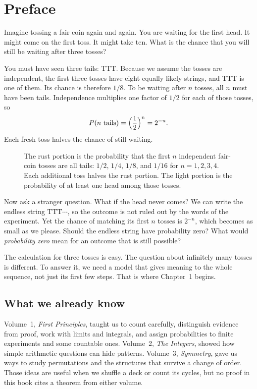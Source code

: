 \chapter*{Preface}

Imagine tossing a fair coin again and again. You are waiting for the first head. It might come on the first toss. It might take ten. What is the chance that you will still be waiting after three tosses?

You must have seen three tails: TTT. Because we assume the tosses are independent, the first three tosses have eight equally likely strings, and TTT is one of them. Its chance is therefore $1/8$. To be waiting after $n$ tosses, all $n$ must have been tails. Independence multiplies one factor of $1/2$ for each of those tosses, so
\[
  P(\text{$n$ tails})=\Bigl(\frac12\Bigr)^n=2^{-n}.
\]
Each fresh toss halves the chance of still waiting.

\begin{figure}[ht]
\centering
{}
\caption{The rust portion is the probability that the first $n$ independent fair-coin tosses are all tails: $1/2$, $1/4$, $1/8$, and $1/16$ for $n=1,2,3,4$. Each additional toss halves the rust portion. The light portion is the probability of at least one head among those tosses.}
\label{fig:prefacetails}
\end{figure}

Now ask a stranger question. What if the head never comes? We can write the endless string TTT$\cdots$, so the outcome is not ruled out by the words of the experiment. Yet the chance of matching its first $n$ tosses is $2^{-n}$, which becomes as small as we please. Should the endless string have probability zero? What would \emph{probability zero} mean for an outcome that is still possible?

The calculation for three tosses is easy. The question about infinitely many tosses is different. To answer it, we need a model that gives meaning to the whole sequence, not just its first few steps. That is where Chapter~1 begins.

\section*{What we already know}

Volume~1, \emph{First Principles}, taught us to count carefully, distinguish evidence from proof, work with limits and integrals, and assign probabilities to finite experiments and some countable ones. Volume~2, \emph{The Integers}, showed how simple arithmetic questions can hide patterns. Volume~3, \emph{Symmetry}, gave us ways to study permutations and the structures that survive a change of order. Those ideas are useful when we shuffle a deck or count its cycles, but no proof in this book cites a theorem from either volume.

